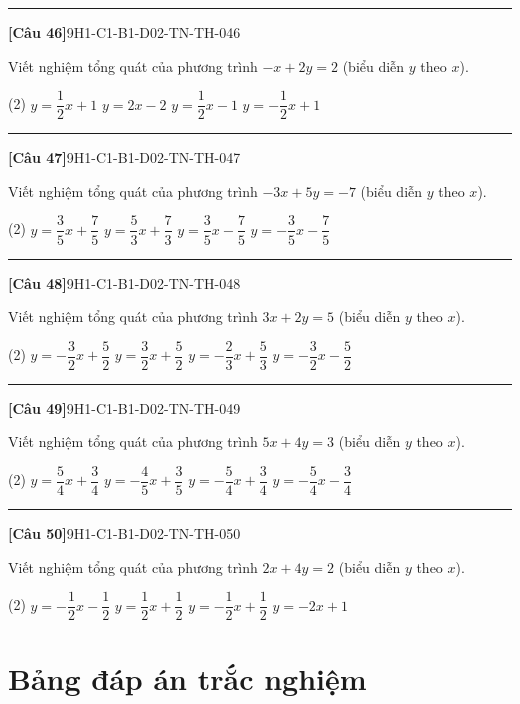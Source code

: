 \documentclass[12pt,a4paper]{article}
\newif\ifloigiai
\newenvironment{cauhoi}[2]{%
  \par\medskip\noindent\rule{\textwidth}{0.4pt}\par\nopagebreak
  \noindent\textbf{[#1]}\hfill{\scriptsize\ttfamily #2}\par\nopagebreak\smallskip}{\par}
\newcommand{\dapan}[1]{\ifloigiai\par\smallskip\noindent\textit{Đáp án:} \textbf{#1}\par\fi}
\begin{document}
\begin{cauhoi}{Câu 46}{9H1-C1-B1-D02-TN-TH-046}
Viết nghiệm tổng quát của phương trình $-x+2y=2$ (biểu diễn $y$ theo $x$).
\begin{tasks}(2)
\task $y=\dfrac{1}{2}x+1$
\task $y=2x-2$
\task $y=\dfrac{1}{2}x-1$
\task $y=-\dfrac{1}{2}x+1$
\end{tasks}
\dapan{A}
\end{cauhoi}
\begin{cauhoi}{Câu 47}{9H1-C1-B1-D02-TN-TH-047}
Viết nghiệm tổng quát của phương trình $-3x+5y=-7$ (biểu diễn $y$ theo $x$).
\begin{tasks}(2)
\task $y=\dfrac{3}{5}x+\dfrac{7}{5}$
\task $y=\dfrac{5}{3}x+\dfrac{7}{3}$
\task $y=\dfrac{3}{5}x-\dfrac{7}{5}$
\task $y=-\dfrac{3}{5}x-\dfrac{7}{5}$
\end{tasks}
\dapan{C}
\end{cauhoi}
\begin{cauhoi}{Câu 48}{9H1-C1-B1-D02-TN-TH-048}
Viết nghiệm tổng quát của phương trình $3x+2y=5$ (biểu diễn $y$ theo $x$).
\begin{tasks}(2)
\task $y=-\dfrac{3}{2}x+\dfrac{5}{2}$
\task $y=\dfrac{3}{2}x+\dfrac{5}{2}$
\task $y=-\dfrac{2}{3}x+\dfrac{5}{3}$
\task $y=-\dfrac{3}{2}x-\dfrac{5}{2}$
\end{tasks}
\dapan{A}
\end{cauhoi}
\begin{cauhoi}{Câu 49}{9H1-C1-B1-D02-TN-TH-049}
Viết nghiệm tổng quát của phương trình $5x+4y=3$ (biểu diễn $y$ theo $x$).
\begin{tasks}(2)
\task $y=\dfrac{5}{4}x+\dfrac{3}{4}$
\task $y=-\dfrac{4}{5}x+\dfrac{3}{5}$
\task $y=-\dfrac{5}{4}x+\dfrac{3}{4}$
\task $y=-\dfrac{5}{4}x-\dfrac{3}{4}$
\end{tasks}
\dapan{C}
\end{cauhoi}
\begin{cauhoi}{Câu 50}{9H1-C1-B1-D02-TN-TH-050}
Viết nghiệm tổng quát của phương trình $2x+4y=2$ (biểu diễn $y$ theo $x$).
\begin{tasks}(2)
\task $y=-\dfrac{1}{2}x-\dfrac{1}{2}$
\task $y=\dfrac{1}{2}x+\dfrac{1}{2}$
\task $y=-\dfrac{1}{2}x+\dfrac{1}{2}$
\task $y=-2x+1$
\end{tasks}
\dapan{C}
\end{cauhoi}
\clearpage\section*{Bảng đáp án trắc nghiệm}
\end{document}
